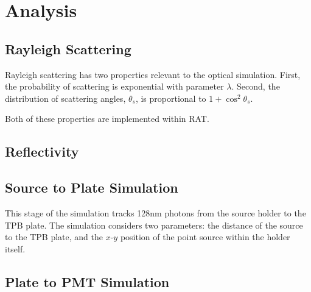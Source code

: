 \documentclass[aps,pra,groupedaddress]{revtex4-1}
\begin{document}
\section{Analysis}

\subsection{Rayleigh Scattering}

Rayleigh scattering has two properties relevant to the optical simulation. First, the probability of scattering is exponential with parameter $\lambda$. Second, the distribution of scattering angles, $\theta_s$, is proportional to $1+\cos^2 \theta_s$.

Both of these properties are implemented within RAT.

\subsection{Reflectivity}

\subsection{Source to Plate Simulation}

This stage of the simulation tracks 128nm photons from the source holder to the TPB plate. The simulation considers two parameters: the distance of the source to the TPB plate, and the $x$-$y$ position of the point source within the holder itself.

\subsection{Plate to PMT Simulation}


\end{document}
